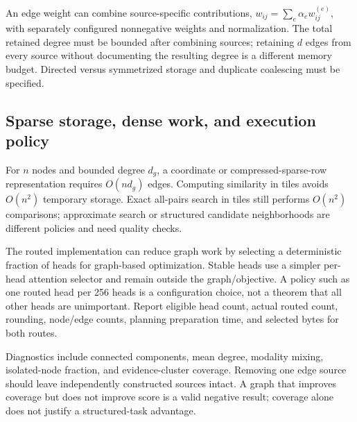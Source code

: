 An edge weight can combine source-specific contributions,
$w_{ij}=\sum_e\alpha_e w_{ij}^{(e)}$, with separately configured nonnegative
weights and normalization. The total retained degree must be bounded after
combining sources; retaining $d$ edges from every source without documenting
the resulting degree is a different memory budget. Directed versus symmetrized
storage and duplicate coalescing must be specified.

\subsection{Sparse storage, dense work, and execution policy}
For $n$ nodes and bounded degree $d_g$, a coordinate or compressed-sparse-row
representation requires $O(nd_g)$ edges. Computing similarity in tiles avoids
$O(n^2)$ temporary storage. Exact all-pairs search in tiles still performs
$O(n^2)$ comparisons; approximate search or structured candidate neighborhoods
are different policies and need quality checks.

The routed implementation can reduce graph work by selecting a deterministic
fraction of heads for graph-based optimization. Stable heads use a simpler
per-head attention selector and remain outside the graph/objective. A policy
such as one routed head per 256 heads is a configuration choice, not a theorem
that all other heads are unimportant. Report eligible head count, actual
routed count, rounding, node/edge counts, planning preparation time, and selected
bytes for both routes.

Diagnostics include connected components, mean degree, modality mixing,
isolated-node fraction, and evidence-cluster coverage. Removing one edge source
should leave independently constructed sources intact. A graph that improves
coverage but does not improve score is a valid negative result; coverage alone
does not justify a structured-task advantage.
